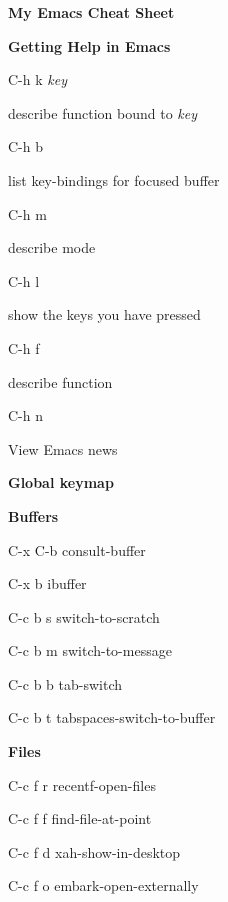\documentclass[10pt]{article}
\renewcommand\section[1]{\bigskip\par\textbf{\color{heading}\large#1}\smallskip}
\renewcommand\subsection[1]{\smallskip\par\textbf{\color{heading}#1}}
\newcommand\humanreadable[1]{{\par\color{default}\small\sffamily#1}}
\newcommand\meta[1]{\textlangle\textit{#1}\textrangle}
\begin{document}
\author{Jousimies}
\begin{multicols}{4}

  \setlength{\columnsep}{1cm}
  \begin{center}
    \LARGE\color{heading}\textbf{My Emacs Cheat Sheet}
  \end{center}

  \section{Getting Help in Emacs}
  \begin{keylist}
    \item[C-h k \meta{key}] \humanreadable{describe function bound to \meta{key}}
    \item[C-h b] \humanreadable{list key-bindings for focused buffer}
    \item[C-h m] \humanreadable{describe mode}
    \item[C-h l] \humanreadable{show the keys you have pressed}
    \item[C-h f] \humanreadable{describe function}
    \item[C-h n] \humanreadable{View Emacs news}
  \end{keylist}

  \section{Global keymap}

  \subsection{Buffers}
  \begin{keylist}
    \item[C-x C-b] consult-buffer
    \item[C-x b] ibuffer
    \item[C-c b s] switch-to-scratch
    \item[C-c b m] switch-to-message
    \item[C-c b b] tab-switch
    \item[C-c b t] tabspaces-switch-to-buffer
  \end{keylist}

  \subsection{Files}
  \begin{keylist}
    \item[C-c f r] recentf-open-files
    \item[C-c f f] find-file-at-point
    \item[C-c f d] xah-show-in-desktop
    \item[C-c f o] embark-open-externally
  \end{keylist}


\end{multicols}
\end{document}
